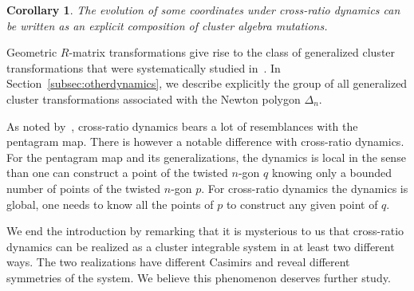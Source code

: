 \documentclass[10pt,a4paper]{amsart}
\numberwithin{equation}{section}
\newtheorem{Corollary}[Theorem]{Corollary}
\begin{document}
	\begin{Corollary}
		The evolution of some coordinates under cross-ratio dynamics can be written as an explicit composition of cluster algebra mutations.
	\end{Corollary}
	
	Geometric $R$-matrix transformations give rise to the class of generalized cluster transformations that were systematically studied in~\cite{GeRa}. In Section~\ref{subsec:otherdynamics}, we describe explicitly the group of all generalized cluster transformations associated with the Newton polygon $\Delta_n$.
	
	As noted by~\cite{AFIT}, cross-ratio dynamics bears a lot of resemblances with the pentagram map. There is however a notable difference with cross-ratio dynamics. For the pentagram map and its generalizations, the dynamics is local in the sense than one can construct a point of the twisted $n$-gon $q$ knowing only a bounded number of points of the twisted $n$-gon $p$. For cross-ratio dynamics the dynamics is global, one needs to know all the points of $p$ to construct any given point of $q$.
	
	We end the introduction by remarking that it is mysterious to us that cross-ratio dynamics can be realized as a cluster integrable system in at least two different ways. The two realizations have different Casimirs and reveal different symmetries of the system. We believe this phenomenon deserves further study.
	
	
\end{document}
